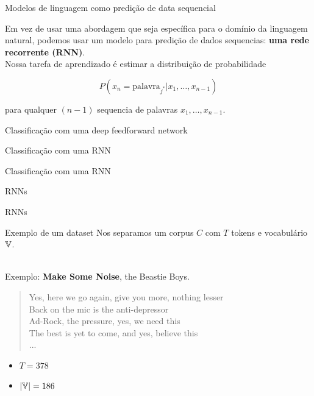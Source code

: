 \documentclass[10pt]{beamer}
\begin{document}
\begin{frame}{Modelos de linguagem como predição de data sequencial}

Em vez de usar uma abordagem que seja específica para o domínio da linguagem natural, podemos usar um modelo para predição de dados sequencias:  \textbf{uma rede recorrente (RNN)}. \\

Nossa tarefa de aprendizado é estimar a distribuição de probabilidade

\[
P(x_{n} = \text{palavra}_{j^{*}} | x_{1}, \dots ,x_{n-1})
\]

para qualquer $(n-1)$ sequencia de palavras $x_{1}, \dots ,x_{n-1}$.
\end{frame}

\begin{frame}{Classificação com uma deep feedforward network}

\end{frame}

\begin{frame}{Classificação com uma RNN}

\end{frame}

\begin{frame}{Classificação com uma RNN}

\end{frame}


\begin{frame}[fragile]{RNNs}

\end{frame}


\begin{frame}[fragile]{RNNs}

\end{frame}



\begin{frame}{Exemplo de um dataset}
Nos separamos um corpus $C$ com $T$ tokens e vocabulário $\mathbb{V}$.\\\

Exemplo: \textbf{Make Some Noise}, the Beastie Boys.\\

\begin{quote}
\alert{Yes, here we go again, give you more, nothing lesser\\
Back on the mic is the anti-depressor\\
Ad-Rock, the pressure, yes, we need this\\
The best is yet to come, and yes, believe this\\
... \\}
\end{quote}

\begin{itemize}
\item $T = 378$
\item $|\mathbb{V}| = 186$
\end{itemize}

\end{frame}
\end{document}

